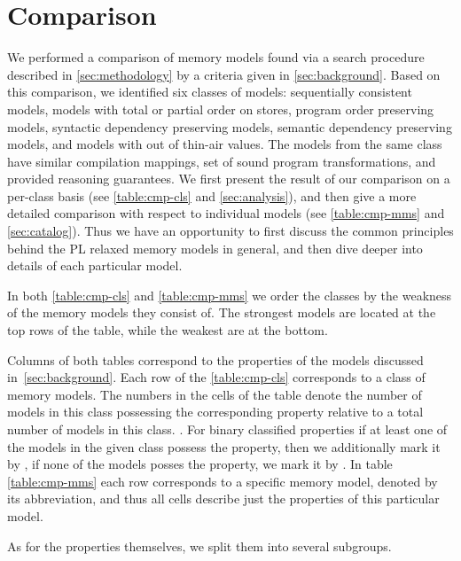 \section{Comparison}
\label{sec:comparison}

We performed a comparison of memory models 
found via a search procedure described in \cref{sec:methodology} 
by a criteria given in \cref{sec:background}. 
Based on this comparison, we identified six classes of models:
sequentially consistent models, %
models with total or partial order on stores, %
program order preserving models, %
syntactic dependency preserving models, %
semantic dependency preserving models, %
and models with out of thin-air values. %
The models from the same class have similar compilation mappings, 
set of sound program transformations, and provided reasoning guarantees.
We first present the result of our comparison on a per-class basis 
(see \cref{table:cmp-cls} and \cref{sec:analysis}), and 
then give a more detailed comparison with respect to individual models
(see \cref{table:cmp-mms} and \cref{sec:catalog}).
Thus we have an opportunity to first discuss the common principles
behind the PL relaxed memory models in general, and then dive deeper 
into details of each particular model. 

In both \cref{table:cmp-cls} and \cref{table:cmp-mms} we order
the classes by the weakness of the memory models they consist of.  
The strongest models are located at the top rows of the table, 
while the weakest are at the bottom.  

Columns of both tables correspond to the properties 
of the models discussed in~\cref{sec:background}.
Each row of the \cref{table:cmp-cls} corresponds to a class of memory models.
The numbers in the cells of the table denote the number of models in this 
class possessing the corresponding property relative to a total number 
of models in this class. .
For binary classified properties if at least one of the models 
in the given class possess the property,
then we additionally mark it by \cmark, 
if none of the models posses the property, we mark it by \xmark.    
In table \cref{table:cmp-mms} each row corresponds to 
a specific memory model, denoted by its abbreviation, 
and thus all cells describe just the properties 
of this particular model. 

As for the properties themselves, we split them into several subgroups.

